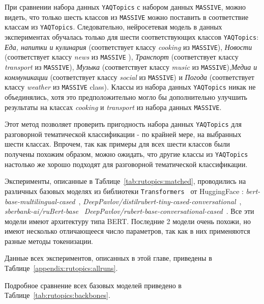 При сравнении набора данных \texttt{YAQTopics} с набором данных \texttt{MASSIVE}, можно видеть, что только шесть классов из \texttt{MASSIVE} можно поставить в соответствие классам из  \texttt{YAQTopics}. Следовательно, нейросетевая модель в данных экспериментах обучалась только для шести соответствующих классов \texttt{YAQTopics}: \textit{Еда, напитки и кулинария} (соответствует классу \textit{cooking} из \texttt{MASSIVE}), \textit{Новости} (соответствует классу \textit{news} из \texttt{MASSIVE} ), \textit{Транспорт} (соответствует классу \textit{transport} из \texttt{MASSIVE}), \textit{Музыка} (соответствует классу \textit{music} из \texttt{MASSIVE}),\textit{Медиа и коммуникации} (соответствует классу \textit{social} из \texttt{MASSIVE}) и \textit{Погода} (соответствует классу \textit{weather} из \texttt{MASSIVE} class). Классы из набора данных \texttt{YAQTopics} никак не объединялись, хотя это предположительно могло бы дополнительно улучшить результаты на классах \textit{cooking} и \textit{transport} из набора данных \texttt{MASSIVE}. 

Этот метод позволяет проверить пригодность набора данных \texttt{YAQTopics} для разговорной тематической классификации - по крайней мере, на выбранных шести классах. Впрочем, так как примеры для всех шести классов были получены похожим образом, можно ожидать, что другие классы из \texttt{YAQTopics} настолько же хорошо подходят для разговорной тематической классификации. 


Эксперименты, описанные в Таблице~\ref{tab:rutopics:matched}, проводились на различных базовых моделях из библиотеки \texttt{Transformers}~\cite{huggingface_transformers} от HuggingFace : \textit{bert-base-multilingual-cased}~\cite{multilingual_bert}, \textit{DeepPavlov/distilrubert-tiny-cased-conversational}~\cite{distilrubert}, \textit{sberbank-ai/ruBert-base}~\cite{sbert_base}  \textit{DeepPavlov/rubert-base-conversational-cased}~\cite{rubert}. Все эти модели имеют архитектуру типа BERT. Последние 2 модели очень похожи, но имеют несколько отличающееся число параметров, так как в них применяются разные методы токенизации. 

Данные всех экспериментов, описанных в этой главе, приведены в Таблице~\ref{appendix:rutopics:allruns}. 

Подробное сравнение всех базовых моделей приведено в Таблице~\ref{tab:rutopics:backbones}.

